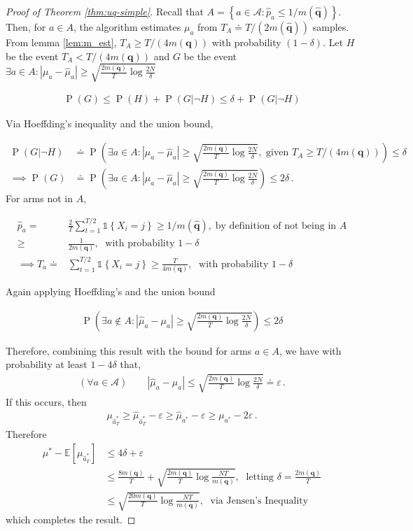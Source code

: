 \documentclass[11pt,a4paper,twoside]{report}
\newcommand{\EE}{\mathbb E}
\newcommand{\actions}{\mathcal{A}}
\newcommand{\set}[1]{\left\{#1\right\}}
\newcommand{\ind}[1]{\mathds{1}\!\!\set{#1}}
\newcommand{\eq}[1]{\begin{align*}#1\end{align*}}
\renewcommand{\P}[1]{\operatorname{P}\left(#1\right)}
\renewcommand{\vec}[1]{\boldsymbol{#1}}
\theoremstyle{plain}
\theoremstyle{definition}
\let\epsilon\varepsilon
\begin{document}
\begin{proof}[Proof of Theorem \ref{thm:uq-simple}]
Recall that $A = \set{a \in \actions : \hat p_a \leq 1/m(\vec{\hat q})}$. Then,
for $a \in A$, the algorithm estimates $\mu_a$ from $T_A \doteq T/(2m(\vec{\hat q}))$ samples. From lemma \ref{lem:m_est}, $T_A  \geq T/(4m(\vec{q}))$ with probability $(1-\delta)$. Let $H$ be the event $T_A < T/(4m(\vec{q}))$ and $G$ be the event $\exists a \in A : |\mu_a - \hat \mu_a| \geq \sqrt{\frac{2m(\vec{q})}{T} \log\frac{2N}{\delta}}$

\eq{
\P{G} \leq \P{H} + \P{G|\neg H} \leq \delta + \P{G|\neg H}
}

Via Hoeffding's inequality and the union bound, 

\eq{
\P{G|\neg H}&\doteq \P{\exists a \in A : |\mu_a - \hat \mu_a| \geq \sqrt{\frac{2m(\vec{q})}{T} \log\frac{2N}{\delta}},\text{ given }T_A \geq T/(4m(\vec{q}))} \leq \delta\\
 \implies  \P{G} & \doteq \P{\exists a \in A : |\mu_a - \hat \mu_a| \geq \sqrt{\frac{2m(\vec{q})}{T} \log\frac{2N}{\delta}}} \leq 2\delta\,.
}
For arms not in $A$,

\eq{
\hat p_a = & \frac{2}{T} \sum_{t=1}^{T/2} \ind{X_i = j} \geq 1/m(\vec{\hat q}), \; \text {by definition of not being in $A$}\\
 \geq & \frac{1}{2m(\vec{q})},\; \text{ with probability } 1-\delta \\
\implies  T_a \doteq & \sum_{t=1}^{T/2} \ind{X_i = j} \geq  \frac{T}{4m(\vec{q})},\; \text{ with probability } 1-\delta
}

Again applying Hoeffding's and the union bound

\eq{
\P{\exists a \notin A:  \left|\hat \mu_a - \mu_a\right| \geq \sqrt{\frac{2m(\vec{q})}{T} \log \frac{2N}{\delta}}} \leq 2\delta
}


Therefore, combining this result with the bound for arms $a \in A$, we have with probability at least $1 - 4\delta$ that,
\eq{
(\forall a \in \actions) \qquad |\hat \mu_a - \mu_a| \leq \sqrt{\frac{2m(\vec{q})}{T} \log \frac{2N}{\delta}} \doteq \epsilon\,.
}
If this occurs, then 
\eq{
\mu_{\hat a^*_T} \geq \hat \mu_{\hat a^*_T} - \epsilon \geq \hat \mu_{a^*} - \epsilon \geq \mu_{a^*} - 2\epsilon\,.
}
Therefore
\eq{
\mu^* - \EE[\mu_{\hat a^*_T}] 
& \leq 4\delta + \epsilon\\
& \leq \frac{8m(\vec{q})}{T} + \sqrt{\frac{2m(\vec{q})}{T} \log \frac{NT}{m(\vec{q})}},\; \text{ letting } \delta = \frac{2m(\vec{q})}{T}\\
& \leq \sqrt{\frac{20m(\vec{q})}{T} \log \frac{NT}{m(\vec{q})}},\; \text{ via Jensen's Inequality}
}
which completes the result.
\end{proof}
\end{document}
